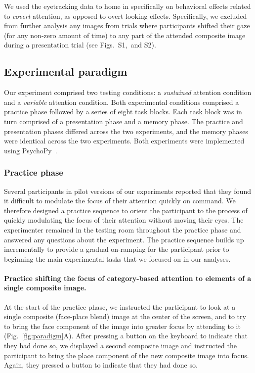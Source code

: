 \documentclass[english]{article}
\newcommand{\gazeLocations}{S1}
\newcommand{\excludedTrials}{S2}
\begin{document}
We used the eyetracking data to home in specifically on behavioral effects
related to \textit{covert} attention, as opposed to overt looking effects.
Specifically, we excluded from further analysis any images from trials where
participants shifted their gaze (for any non-zero amount of time) to any part
of the attended composite image during a presentation trial
(see Figs.~\gazeLocations,~and \excludedTrials).

\subsection*{Experimental paradigm}

Our experiment comprised two testing conditions: a \textit{sustained} attention
condition and a \textit{variable} attention condition. Both experimental
conditions comprised a practice phase followed by a series of eight task
blocks. Each task block was in turn comprised of a presentation phase and a
memory phase. The practice and presentation phases differed across the two
experiments, and the memory phases were identical across the two experiments.
Both experiments were implemented using PsychoPy~\citep{PeirEtal19}.

\subsubsection*{Practice phase}

Several participants in pilot versions of our experiments reported that they
found it difficult to modulate the focus of their attention quickly on command.
We therefore designed a practice sequence to orient the participant to the
process of quickly modulating the focus of their attention without moving their
eyes. The experimenter remained in the testing room throughout the practice
phase and answered any questions about the experiment. The practice sequence
builds up incrementally to provide a gradual on-ramping for the participant
prior to beginning the main experimental tasks that we focused on in our
analyses.

\paragraph{Practice shifting the focus of category-based attention to elements
of a single composite image.}

At the start of the practice phase, we instructed the participant to look at a
single composite (face-place blend) image at the center of the screen, and to
try to bring the face component of the image into greater focus by attending to
it (Fig.~\ref{fig:paradigm}A). After pressing a button on the keyboard to
indicate that they had done so, we displayed a second composite image and
instructed the participant to bring the place component of the new composite
image into focus. Again, they pressed a button to indicate that they had done
so.
\end{document}
